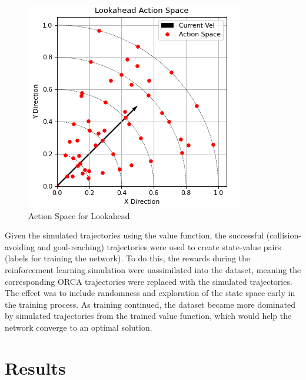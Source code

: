 \documentclass[conference]{IEEEtran}
\begin{document}
\begin{figure}[h!]
    \centering
    \includegraphics[width=0.9\linewidth]{docs/latex/figures/action_space.PNG}
    \caption{Action Space for Lookahead}
    \label{fig:actionspace}
\end{figure}

Given the simulated trajectories using the value function, the successful (collision-avoiding and goal-reaching) trajectories were used to create state-value pairs (labels for training the network). To do this, the rewards during the reinforcement learning simulation were uassimilated into the dataset, meaning the corresponding ORCA trajectories were replaced with the simulated trajectories. The effect was to include randomness and exploration of the state space early in the training process. As training continued, the dataset became more dominated by simulated trajectories from the trained value function, which would help the network converge to an optimal solution.

\section{Results}
\end{document}
